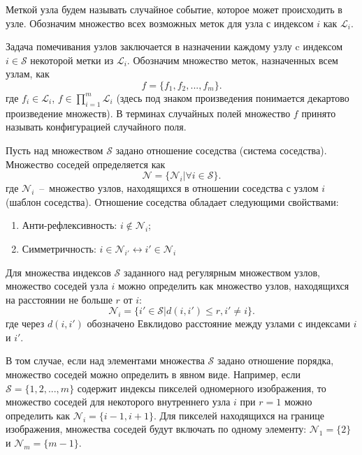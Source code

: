 Меткой узла будем называть случайное событие, которое может происходить в узле. Обозначим множество всех возможных меток для узла с индексом $i$ как $\mathcal{L}_i$. 

Задача помечивания узлов заключается в назначении каждому узлу c индексом $i \in \mathcal{S}$ некоторой метки из $\mathcal{L}_i$. Обозначим множество меток, назначенных всем узлам, как
\begin{equation*}
f = \{ f_1,f_2,...,f_m \}.
\end{equation*}
где $f_i \in \mathcal{L}_i$, $f \in \prod\limits_{i=1}^{m}\mathcal{L}_i$ (здесь 
под знаком произведения понимается декартово произведение множеств).
В терминах случайных полей множество $f$ принято называть конфигурацией 
случайного поля. 

Пусть над множеством $\mathcal{S}$ задано отношение соседства (система соседства). Множество соседей определяется как 
\begin{equation*}
\mathcal{N} = \{ \mathcal{N}_i| \forall i \in \mathcal{S} \}.
\end{equation*}
где $\mathcal{N}_i$~--~множество узлов, находящихся в отношении соседства с узлом $i$ (шаблон соседства). Отношение соседства обладает следующими свойствами:
\begin{enumerate}
\item Анти-рефлексивность: $i \notin \mathcal{N}_i$;
\item Симметричность: $i \in \mathcal{N}_{i'} \leftrightarrow i' \in \mathcal{N}_{i}$
\end{enumerate}
Для множества индексов $\mathcal{S}$ заданного над регулярным множеством узлов, множество соседей узла $i$ можно определить как множество узлов, находящихся на расстоянии не больше $r$ от $i$:
\begin{equation*}
\mathcal{N}_i = \{ i' \in \mathcal{S} \vert d(i,i') \leq r, i' \neq i \}.
\end{equation*}
где через $d(i,i')$ обозначено Евклидово расстояние между узлами с индексами $i$ и $i'$.

В том случае, если над элементами множества $\mathcal{S}$ задано отношение порядка, множество соседей можно определить в явном виде. Например, если $\mathcal{S}=\{1,2,...,m\}$ содержит индексы пикселей одномерного изображения, то множество соседей для некоторого внутреннего узла $i$ при $r=1$ можно определить как $\mathcal{N}_i=\{i-1,i+1\}$. Для пикселей находящихся на границе изображения, множества соседей будут включать по одному элементу: $\mathcal{N}_1=\{2\}$ и $\mathcal{N}_m=\{m-1\}$.

